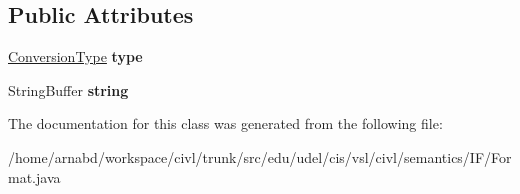 \subsection*{Public Attributes}
\begin{DoxyCompactItemize}
\item 
\hypertarget{classedu_1_1udel_1_1cis_1_1vsl_1_1civl_1_1semantics_1_1IF_1_1Format_aa19cdaba2773a3cfb9e9edbf30165b5a}{}\hyperlink{enumedu_1_1udel_1_1cis_1_1vsl_1_1civl_1_1semantics_1_1IF_1_1Format_1_1ConversionType}{Conversion\+Type} {\bfseries type}\label{classedu_1_1udel_1_1cis_1_1vsl_1_1civl_1_1semantics_1_1IF_1_1Format_aa19cdaba2773a3cfb9e9edbf30165b5a}

\item 
\hypertarget{classedu_1_1udel_1_1cis_1_1vsl_1_1civl_1_1semantics_1_1IF_1_1Format_acd54546d09dec57e323ba3ab5b40ad1a}{}String\+Buffer {\bfseries string}\label{classedu_1_1udel_1_1cis_1_1vsl_1_1civl_1_1semantics_1_1IF_1_1Format_acd54546d09dec57e323ba3ab5b40ad1a}

\end{DoxyCompactItemize}


The documentation for this class was generated from the following file\+:\begin{DoxyCompactItemize}
\item 
/home/arnabd/workspace/civl/trunk/src/edu/udel/cis/vsl/civl/semantics/\+I\+F/Format.\+java\end{DoxyCompactItemize}
